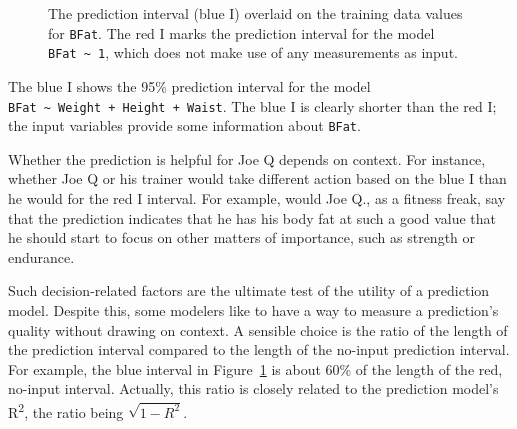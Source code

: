 \documentclass[
  letterpaper,
  DIV=11,
  numbers=noendperiod,
  oneside]{scrartcl}
\begin{document}
\begin{tcolorbox}
\begin{figure}[H]


\caption{\label{fig-bfat-how-good}The prediction interval (blue I)
overlaid on the training data values for \texttt{BFat}. The red I marks
the prediction interval for the model
\texttt{BFat\ \textasciitilde{}\ 1}, which does not make use of any
measurements as input.}

\end{figure}%

The blue I shows the 95\% prediction interval for the model
\texttt{BFat\ \textasciitilde{}\ Weight\ +\ Height\ +\ Waist}. The blue
I is clearly shorter than the red I; the input variables provide some
information about \texttt{BFat}.

Whether the prediction is helpful for Joe Q depends on context. For
instance, whether Joe Q or his trainer would take different action based
on the blue I than he would for the red I interval. For example, would
Joe Q., as a fitness freak, say that the prediction indicates that he
has his body fat at such a good value that he should start to focus on
other matters of importance, such as strength or endurance.

Such decision-related factors are the ultimate test of the utility of a
prediction model. Despite this, some modelers like to have a way to
measure a prediction's quality without drawing on context. A sensible
choice is the ratio of the length of the prediction interval compared to
the length of the no-input prediction interval. For example, the blue
interval in Figure~\ref{fig-bfat-how-good} is about 60\% of the length
of the red, no-input interval. Actually, this ratio is closely related
to the prediction model's R\textsuperscript{2}, the ratio being
\(\sqrt{1 - R^2}\).


\end{tcolorbox}
\end{document}
